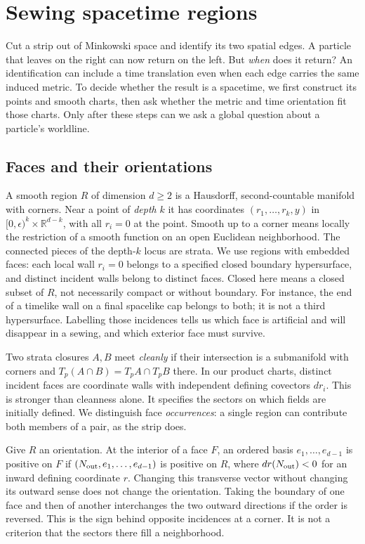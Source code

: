 \chapter{Sewing spacetime regions}\label{ch:01}

Cut a strip out of Minkowski space and identify its two spatial edges. A particle that leaves on the right can now return on the left. But \emph{when} does it return? An identification can include a time translation even when each edge carries the same induced metric. To decide whether the result is a spacetime, we first construct its points and smooth charts, then ask whether the metric and time orientation fit those charts. Only after these steps can we ask a global question about a particle's worldline.

\section{Faces and their orientations}

A smooth region $R$ of dimension $d\geq 2$ is a Hausdorff, second-countable manifold with corners. Near a point of \emph{depth} $k$ it has coordinates $(r_1,\ldots,r_k,y)$ in $[0,\epsilon)^k\times\mathbb R^{d-k}$, with all $r_i=0$ at the point. Smooth up to a corner means locally the restriction of a smooth function on an open Euclidean neighborhood. The connected pieces of the depth-$k$ locus are strata. We use regions with embedded faces: each local wall $r_i=0$ belongs to a specified closed boundary hypersurface, and distinct incident walls belong to distinct faces. Closed here means a closed subset of $R$, not necessarily compact or without boundary. For instance, the end of a timelike wall on a final spacelike cap belongs to both; it is not a third hypersurface. Labelling those incidences tells us which face is artificial and will disappear in a sewing, and which exterior face must survive.

Two strata closures $A,B$ meet \emph{cleanly} if their intersection is a submanifold with corners and $T_p(A\cap B)=T_pA\cap T_pB$ there. In our product charts, distinct incident faces are coordinate walls with independent defining covectors $dr_i$. This is stronger than cleanness alone. It specifies the sectors on which fields are initially defined. We distinguish face \emph{occurrences}: a single region can contribute both members of a pair, as the strip does.

Give $R$ an orientation. At the interior of a face $F$, an ordered basis $e_1,\dots,e_{d-1}$ is positive on $F$ if $(N_{\rm out},e_1,\dots,e_{d-1})$ is positive on $R$, where $dr(N_{\rm out})<0$ for an inward defining coordinate $r$. Changing this transverse vector without changing its outward sense does not change the orientation. Taking the boundary of one face and then of another interchanges the two outward directions if the order is reversed. This is the sign behind opposite incidences at a corner. It is not a criterion that the sectors there fill a neighborhood.

